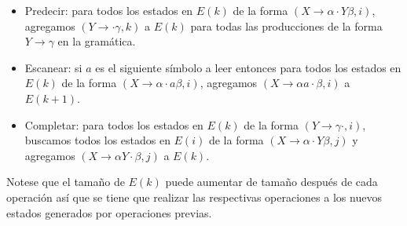 \documentclass[12pt]{article}
\begin{document}
\begin{itemize}
    \item Predecir: para todos los estados en $E(k)$ de la forma $(X \rightarrow \alpha \cdot Y \beta,i)$, agregamos $(Y \rightarrow \cdot \gamma , k)$ a $E(k)$ para todas las producciones de la forma $Y \rightarrow \gamma$ en la gramática.
    \item Escanear: si $a$ es el siguiente símbolo a leer entonces para todos los estados en $E(k)$ de la forma $(X \rightarrow \alpha \cdot a \beta,i)$, agregamos $(X \rightarrow \alpha a \cdot \beta,i)$ a $E(k+1)$.
    \item Completar:  para todos los estados en $E(k)$ de la forma $(Y \rightarrow \gamma \cdot, i)$, buscamos todos los estados en $E(i)$ de la forma $(X \rightarrow \alpha \cdot Y \beta,j)$ y agregamos $(X \rightarrow \alpha Y \cdot \beta,j)$ a $E(k)$.
\end{itemize}

Notese que el tamaño de $E(k)$ puede aumentar de tamaño después de cada operación así que se tiene que realizar las respectivas operaciones a los nuevos estados generados por operaciones previas.


%


\newpage

  

\end{document}
